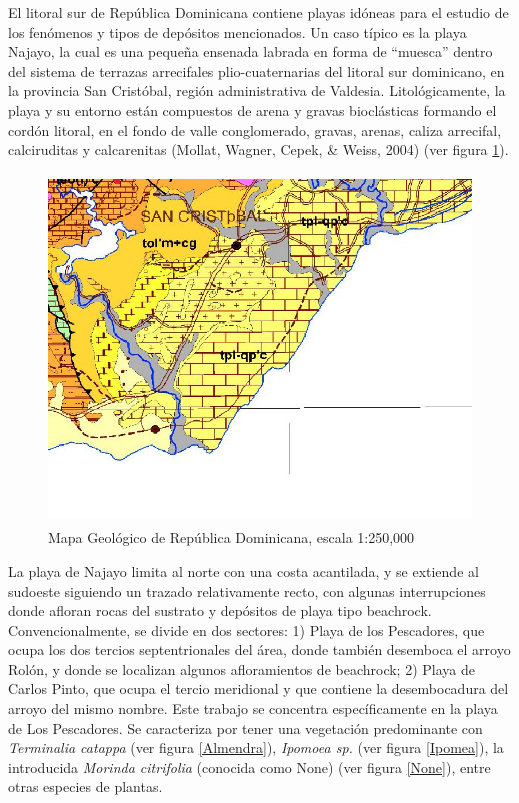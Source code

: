 \documentclass[11pt,]{article}
\begin{document}
El litoral sur de República Dominicana contiene playas idóneas para el
estudio de los fenómenos y tipos de depósitos mencionados. Un caso
típico es la playa Najayo, la cual es una pequeña ensenada labrada en
forma de ``muesca'' dentro del sistema de terrazas arrecifales
plio-cuaternarias del litoral sur dominicano, en la provincia San
Cristóbal, región administrativa de Valdesia. Litológicamente, la playa
y su entorno están compuestos de arena y gravas bioclásticas formando el
cordón litoral, en el fondo de valle conglomerado, gravas, arenas,
caliza arrecifal, calciruditas y calcarenitas (Mollat, Wagner, Cepek, \&
Weiss, 2004) (ver figura \ref{mapa_geologico}).

\begin{figure}
\centering
\includegraphics[height=3.64583in]{mapa geologico de najayo.jpg}
\caption{Mapa Geológico de República Dominicana, escala 1:250,000
\label{mapa_geologico}}
\end{figure}

La playa de Najayo limita al norte con una costa acantilada, y se
extiende al sudoeste siguiendo un trazado relativamente recto, con
algunas interrupciones donde afloran rocas del sustrato y depósitos de
playa tipo beachrock. Convencionalmente, se divide en dos sectores: 1)
Playa de los Pescadores, que ocupa los dos tercios septentrionales del
área, donde también desemboca el arroyo Rolón, y donde se localizan
algunos afloramientos de beachrock; 2) Playa de Carlos Pinto, que ocupa
el tercio meridional y que contiene la desembocadura del arroyo del
mismo nombre. Este trabajo se concentra específicamente en la playa de
Los Pescadores. Se caracteriza por tener una vegetación predominante con
\emph{Terminalia catappa} (ver figura \ref{Almendra}), \emph{Ipomoea
sp.} (ver figura \ref{Ipomea}), la introducida \emph{Morinda citrifolia}
(conocida como None) (ver figura \ref{None}), entre otras especies de
plantas.
\end{document}
